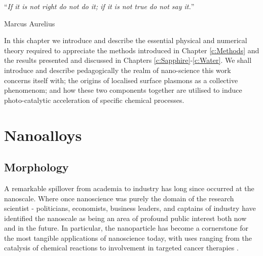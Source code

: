 



\noindent\enquote{\itshape If it is not right do not do it; if it is not true do not say it.}\bigbreak

\hfill Marcus Aurelius

\vspace*{0.05\textheight}

In this chapter we introduce and describe the essential physical and numerical theory required to appreciate the methods introduced in Chapter \ref{c:Methods} and the results presented and discussed in Chapters \ref{c:Sapphire}-\ref{c:Water}. We shall introduce and describe pedagogically the realm of nano-science this work concerns itself with; the origins of localised surface plasmons as a collective phenomenom; and how these two components together are utilised to induce photo-catalytic acceleration of specific chemical processes.


\section{Nanoalloys}
\label{sec:NAs_Theory}
\subsection{Morphology}
\label{sec:morph}
A remarkable spillover from academia to industry has long since occurred at the nanoscale. Where once nanoscience was purely the domain of the research scientist - politicians, economists, business leaders, and captains of industry have identified the nanoscale as being an area of profound public interest both now and in the future. In particular, the nanoparticle has become a cornerstone for the most tangible applications of nanoscience today, with uses ranging from the catalysis of chemical reactions to involvement in targeted cancer therapies \cite{doi:10.1021/cr040090g,Fra_Ricardo_Review,ZALESKAMEDYNSKA201680}.

